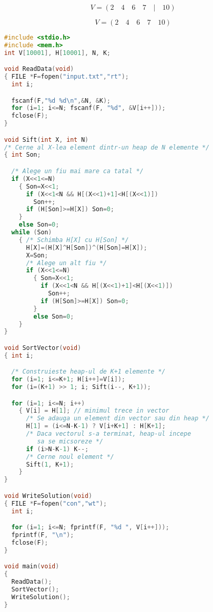 
\begin{equation*}
  V = (2 \quad 4 \quad 6 \quad 7 \quad | \quad 10)
\end{equation*}


\begin{equation*}
  V = (2 \quad 4 \quad 6 \quad 7 \quad 10)
\end{equation*}

\begin{lstlisting}[language=C]
#include <stdio.h>
#include <mem.h>
int V[10001], H[10001], N, K;

void ReadData(void)
{ FILE *F=fopen("input.txt","rt");
  int i;

  fscanf(F,"%d %d\n",&N, &K);
  for (i=1; i<=N; fscanf(F, "%d", &V[i++]));
  fclose(F);
}

void Sift(int X, int N)
/* Cerne al X-lea element dintr-un heap de N elemente */
{ int Son;

  /* Alege un fiu mai mare ca tatal */
  if (X<<1<=N)
    { Son=X<<1;
      if (X<<1<N && H[(X<<1)+1]<H[(X<<1)])
        Son++;
      if (H[Son]>=H[X]) Son=0;
    }
    else Son=0;
  while (Son)
    { /* Schimba H[X] cu H[Son] */
      H[X]=(H[X]^H[Son])^(H[Son]=H[X]);
      X=Son;
      /* Alege un alt fiu */
      if (X<<1<=N)
        { Son=X<<1;
          if (X<<1<N && H[(X<<1)+1]<H[(X<<1)])
            Son++;
          if (H[Son]>=H[X]) Son=0;
        }
        else Son=0;
    }
}

void SortVector(void)
{ int i;

  /* Construieste heap-ul de K+1 elemente */
  for (i=1; i<=K+1; H[i++]=V[i]);
  for (i=(K+1) >> 1; i; Sift(i--, K+1));

  for (i=1; i<=N; i++)
    { V[i] = H[1]; // minimul trece in vector
      /* Se adauga un element din vector sau din heap */
      H[1] = (i<=N-K-1) ? V[i+K+1] : H[K+1];
      /* Daca vectorul s-a terminat, heap-ul incepe
         sa se micsoreze */
      if (i>N-K-1) K--;
      /* Cerne noul element */
      Sift(1, K+1);
    }
}

void WriteSolution(void)
{ FILE *F=fopen("con","wt");
  int i;

  for (i=1; i<=N; fprintf(F, "%d ", V[i++]));
  fprintf(F, "\n");
  fclose(F);
}

void main(void)
{
  ReadData();
  SortVector();
  WriteSolution();
}
\end{lstlisting}
